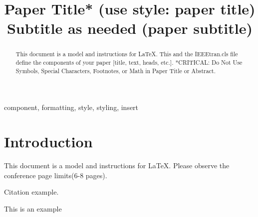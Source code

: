 \documentclass[conference]{IEEEtran}
\begin{document}
\title{Paper Title* (use style: paper title)\\ \large
Subtitle as needed (paper subtitle)
}

\author{
\and
{}
}

\maketitle

\begin{abstract}
This document is a model and instructions for \LaTeX.
This and the IEEEtran.cls file define the components of your paper [title, text, heads, etc.]. *CRITICAL: Do Not Use Symbols, Special Characters, Footnotes, 
or Math in Paper Title or Abstract.
\end{abstract}

\begin{IEEEkeywords}
component, formatting, style, styling, insert
\end{IEEEkeywords}

\thispagestyle{firstpagefooter}

\section{Introduction}
This document is a model and instructions for \LaTeX.
Please observe the conference page limits(6-8 pages).

Citation example\cite{puente2013review}.

This is an example\cite{klopfer2008augmented}

\lipsum[1-30]%
\end{document}
